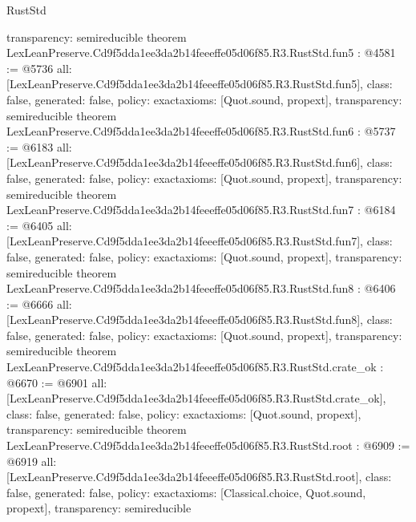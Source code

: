 \begin{lexlean}{RustStd}
\begin{coremodule}
{  transparency: semireducible
}
theorem LexLeanPreserve.Cd9f5dda1ee3da2b14feeeffe05d06f85.R3.RustStd.fun5 : @4581 := @5736 {
  all: [LexLeanPreserve.Cd9f5dda1ee3da2b14feeeffe05d06f85.R3.RustStd.fun5],
  class: false,
  generated: false,
  policy: exact{axioms: [Quot.sound, propext]},
  transparency: semireducible
}
theorem LexLeanPreserve.Cd9f5dda1ee3da2b14feeeffe05d06f85.R3.RustStd.fun6 : @5737 := @6183 {
  all: [LexLeanPreserve.Cd9f5dda1ee3da2b14feeeffe05d06f85.R3.RustStd.fun6],
  class: false,
  generated: false,
  policy: exact{axioms: [Quot.sound, propext]},
  transparency: semireducible
}
theorem LexLeanPreserve.Cd9f5dda1ee3da2b14feeeffe05d06f85.R3.RustStd.fun7 : @6184 := @6405 {
  all: [LexLeanPreserve.Cd9f5dda1ee3da2b14feeeffe05d06f85.R3.RustStd.fun7],
  class: false,
  generated: false,
  policy: exact{axioms: [Quot.sound, propext]},
  transparency: semireducible
}
theorem LexLeanPreserve.Cd9f5dda1ee3da2b14feeeffe05d06f85.R3.RustStd.fun8 : @6406 := @6666 {
  all: [LexLeanPreserve.Cd9f5dda1ee3da2b14feeeffe05d06f85.R3.RustStd.fun8],
  class: false,
  generated: false,
  policy: exact{axioms: [Quot.sound, propext]},
  transparency: semireducible
}
theorem LexLeanPreserve.Cd9f5dda1ee3da2b14feeeffe05d06f85.R3.RustStd.crate_ok : @6670 := @6901 {
  all: [LexLeanPreserve.Cd9f5dda1ee3da2b14feeeffe05d06f85.R3.RustStd.crate_ok],
  class: false,
  generated: false,
  policy: exact{axioms: [Quot.sound, propext]},
  transparency: semireducible
}
theorem LexLeanPreserve.Cd9f5dda1ee3da2b14feeeffe05d06f85.R3.RustStd.root : @6909 := @6919 {
  all: [LexLeanPreserve.Cd9f5dda1ee3da2b14feeeffe05d06f85.R3.RustStd.root],
  class: false,
  generated: false,
  policy: exact{axioms: [Classical.choice, Quot.sound, propext]},
  transparency: semireducible
}


\end{coremodule}
\end{lexlean}
